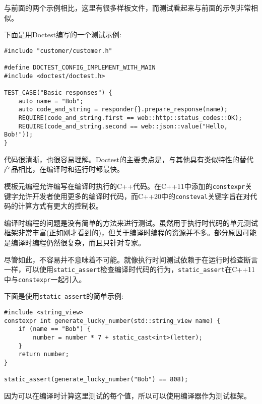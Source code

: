 与前面的两个示例相比，这里有很多样板文件，而测试看起来与前面的示例非常相似。


下面是用Doctest编写的一个测试示例:

\begin{lstlisting}[style=styleCXX]
#include "customer/customer.h"

#define DOCTEST_CONFIG_IMPLEMENT_WITH_MAIN
#include <doctest/doctest.h>

TEST_CASE("Basic responses") {
	auto name = "Bob";
	auto code_and_string = responder{}.prepare_response(name);
	REQUIRE(code_and_string.first == web::http::status_codes::OK);
	REQUIRE(code_and_string.second == web::json::value("Hello, Bob!"));
}
\end{lstlisting}

代码很清晰，也很容易理解。Doctest的主要卖点是，与其他具有类似特性的替代产品相比，在编译时和运行时都最快。


模板元编程允许编写在编译时执行的C++代码。在C++11中添加的\texttt{constexpr}关键字允许开发者使用更多的编译时代码，而C++20中的\texttt{consteval}关键字旨在对代码的计算方式有更大的控制权。

编译时编程的问题是没有简单的方法来进行测试。虽然用于执行时代码的单元测试框架非常丰富(正如刚才看到的)，但关于编译时编程的资源并不多。部分原因可能是编译时编程仍然很复杂，而且只针对专家。

尽管如此，不容易并不意味着不可能。就像执行时间测试依赖于在运行时检查断言一样，可以使用\texttt{static\_assert}检查编译时代码的行为，\texttt{static\_assert}在C++11中与\texttt{constexpr}一起引入。

下面是使用\texttt{static\_assert}的简单示例:

\begin{lstlisting}[style=styleCXX]
#include <string_view>
constexpr int generate_lucky_number(std::string_view name) {
	if (name == "Bob") {
		number = number * 7 + static_cast<int>(letter);
	}
	return number;
}

static_assert(generate_lucky_number("Bob") == 808);
\end{lstlisting}

因为可以在编译时计算这里测试的每个值，所以可以使用编译器作为测试框架。











